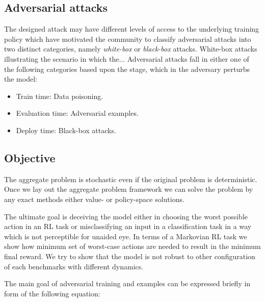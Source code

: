 \documentclass{article}
\begin{document}
    \subsection{Adversarial attacks}
    The designed attack may have different levels of access to the underlying training policy which have motivated
    the community to classify adversarial attacks into two distinct categories, namely \textit{white-box} or
    \textit{black-box} attacks. White-box attacks illustrating the scenario in which the... Adversarial attacks fall
    in either one of the following categories based upon the stage, which in the adversary perturbs the model:
    \begin{itemize}
        \item Train time: Data poisoning.
        \item Evaluation time: Adversarial examples.
        \item Deploy time: Black-box attacks.
    \end{itemize}


    \subsection{Objective}
    The aggregate problem is stochastic even if the original problem is deterministic. Once we lay out the aggregate
    problem framework we can solve the problem by any exact methods either value- or policy-space solutions.


    The ultimate goal is deceiving the model either in choosing the worst possible action in an RL task or misclassifying an input in a classification task in a way which is not perceptible for unaided eye. In terms of a Markovian RL task we show how minimum set of worst-case actions are needed to result in the minimum final reward. We try to show that the model is not robust to other configuration of each benchmarks with different dynamics.

    The main goal of adversarial training and examples can be expressed briefly in form of the following equation:
\end{document}
